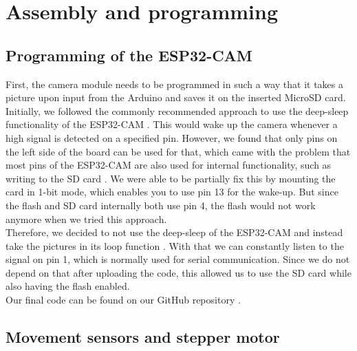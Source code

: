\documentclass{article}
\begin{document}
\newpage
\section{Assembly and programming}

\subsection{Programming of the ESP32-CAM}
First, the camera module needs to be programmed in such a way that it takes a picture upon input from the Arduino and saves it on the inserted MicroSD card. \\
Initially, we followed the commonly recommended approach to use the deep-sleep functionality of the ESP32-CAM \cite{esp_cam_start}. This would wake up the camera whenever a high signal is detected on a specified pin. However, we found that only pins on the left side of the board can be used for that, which came with the problem that most pins of the ESP32-CAM are also used for internal functionality, such as writing to the SD card \cite{esp_cam_pins}. We were able to be partially fix this by mounting the card in 1-bit mode, which enables you to use pin 13 for the wake-up. But since the flash and SD card internally both use pin 4, the flash would not work anymore when we tried this approach. \\
Therefore, we decided to not use the deep-sleep of the ESP32-CAM and instead take the pictures in its loop function \cite{esp_cam_loop}.
With that we can constantly listen to the signal on pin 1, which is normally used for serial communication. Since we do not depend on that after uploading the code, this allowed us to use the SD card while also having the flash enabled. \\
Our final code can be found on our GitHub repository \cite{github}.

\subsection{Movement sensors and stepper motor}
\end{document}
